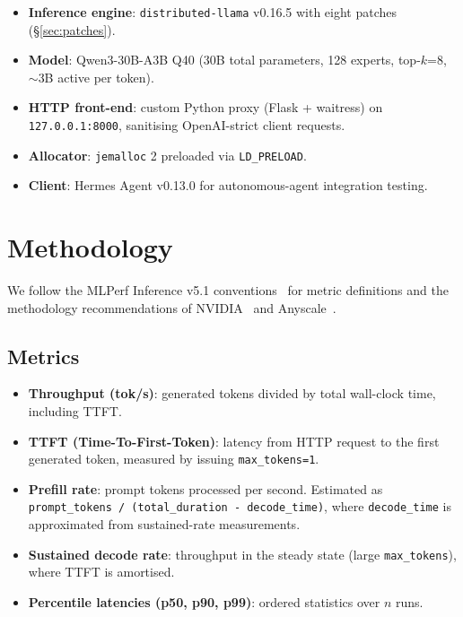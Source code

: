 \documentclass[11pt,a4paper]{article}
\begin{document}
\begin{itemize}[leftmargin=*,nosep]
  \item \textbf{Inference engine}: \texttt{distributed-llama} v0.16.5 with eight patches (\S\ref{sec:patches}).
  \item \textbf{Model}: Qwen3-30B-A3B Q40 (30B total parameters, 128 experts, top-$k$=8, $\sim$3B active per token).
  \item \textbf{HTTP front-end}: custom Python proxy (Flask + waitress) on \texttt{127.0.0.1:8000}, sanitising OpenAI-strict client requests.
  \item \textbf{Allocator}: \texttt{jemalloc} 2 preloaded via \texttt{LD\_PRELOAD}.
  \item \textbf{Client}: Hermes Agent v0.13.0 for autonomous-agent integration testing.
\end{itemize}

\section{Methodology}

We follow the MLPerf Inference v5.1 conventions~\cite{mlperf2025} for metric definitions and the methodology recommendations of NVIDIA~\cite{nvidia2024metrics} and Anyscale~\cite{anyscale2024metrics}.

\subsection{Metrics}

\begin{itemize}[leftmargin=*,nosep]
  \item \textbf{Throughput (tok/s)}: generated tokens divided by total wall-clock time, including TTFT.
  \item \textbf{TTFT (Time-To-First-Token)}: latency from HTTP request to the first generated token, measured by issuing \texttt{max\_tokens=1}.
  \item \textbf{Prefill rate}: prompt tokens processed per second. Estimated as \texttt{prompt\_tokens / (total\_duration - decode\_time)}, where \texttt{decode\_time} is approximated from sustained-rate measurements.
  \item \textbf{Sustained decode rate}: throughput in the steady state (large \texttt{max\_tokens}), where TTFT is amortised.
  \item \textbf{Percentile latencies (p50, p90, p99)}: ordered statistics over $n$ runs.
\end{itemize}
\end{document}
